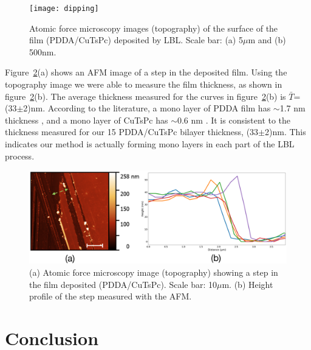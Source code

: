 \documentclass[%
 reprint,
 amsmath,amssymb,
 aps,
]{revtex4-1}
\begin{document}
\begin{figure}[h!]
	\centering
	\texttt{[image: dipping]}
	\caption{Atomic force microscopy images (topography) of the surface of the film (PDDA/CuTsPc) deposited by LBL. Scale bar: (a) 5$\mu$m and (b) 500nm.}
	\label{fig:3}
\end{figure}

Figure~\ref{fig:2}(a) shows an AFM image of a step in the deposited film. Using the topography image we were able to measure the film thickness, as shown in figure~\ref{fig:2}(b). The average thickness measured for the curves in figure~\ref{fig:2}(b) is $\bar{T}$=(33$\pm$2)nm. According to the literature, a mono layer of PDDA film has $\sim$1.7 nm thickness \cite{PDDA}, and a mono layer of CuTsPc has $\sim$0.6 nm \cite{Cu}. It is consistent to the thickness measured for our 15 PDDA/CuTsPc bilayer thickness, (33$\pm$2)nm. This indicates our method is actually forming mono layers in each part of the LBL process. 


\begin{figure}[h!]
	\centering
	\includegraphics[width=0.98\columnwidth]{degrau1}
	\caption{(a) Atomic force microscopy image (topography) showing a step in the film deposited (PDDA/CuTsPc). Scale bar: 10$\mu$m. (b) Height profile of the step measured with the AFM.}
	\label{fig:2}
\end{figure}




\section{Conclusion}

\begin{thebibliography}{10}

\end{thebibliography}

%
%
\end{document}
